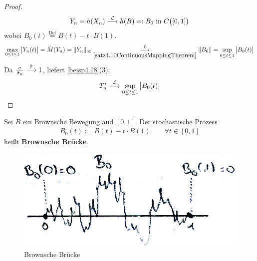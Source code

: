 \begin{proof}
	\begin{align*}
		Y_n=h(X_n)\stackrel{\L}{\longrightarrow} h(B)=:B_0\text{ in }C\big([0,1]\big)
	\end{align*}
	wobei $B_0(t)\overset{\text{Def}}{=}B(t)-t\cdot B(1)$.
	\begin{align*}
		\max\limits_{0\leq t\leq 1}\big|Y_n(t)\big|=\hat{M}(Y_n)=\Vert Y_n\Vert_\infty
		\stackrelnew{\ref{satz4.10ContinuousMappingTheorem}}{\L}{\longrightarrow}
		\Vert B_0\Vert=\sup\limits_{0\leq t\leq 1}\big|B_0(t)\big|
	\end{align*}
	Da $\frac{\sigma}{\hat{\sigma}_n}\stackrel{\P}{\longrightarrow}1$, liefert \ref{beisp4.18}(3):
	\begin{align*}
		T_n^\ast\stackrel{\L}{\longrightarrow}\sup\limits_{0\leq t\leq 1}\big|B_0(t)\big|
	\end{align*}
\end{proof}

\begin{definition} %
	Sei $B$ ein Brownsche Bewegung aud $[0,1]$. Der stochastische Prozess
	\begin{align*}
		B_0(t):=B(t)-t\cdot B(1)\qquad\forall t\in[0,1]
	\end{align*}
	heißt \textbf{Brownsche Brücke}.
\end{definition}

\begin{figure}[H]
	\begin{center}
		\includegraphics[width=1\textwidth]{./pics/MSTAT002.png}
		\caption{Brownsche Brücke}
		\label{AbbBrownscheBruecke}
	\end{center}
\end{figure}


